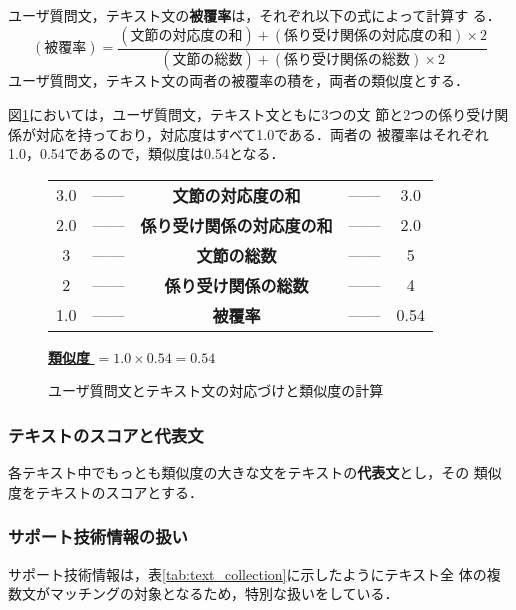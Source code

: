 ユーザ質問文，テキスト文の{\bf 被覆率}は，それぞれ以下の式によって計算す
る．
\[
 (被覆率) = \frac{(文節の対応度の和) + (係り受け関係の対応度の和) \times 2}
  {(文節の総数) + (係り受け関係の総数) \times 2}
\]
ユーザ質問文，テキスト文の両者の被覆率の積を，両者の類似度とする．

図\ref{fig:スコア計算}においては，ユーザ質問文，テキスト文ともに3つの文
節と2つの係り受け関係が対応を持っており，対応度はすべて1.0である．両者の
被覆率はそれぞれ1.0，0.54であるので，類似度は0.54となる．

\begin{figure}
 \begin{center}
  \vspace*{5mm}
  \begin{tabular}{ccccc}
   3.0 & ------ & {\bf 文節の対応度の和} & ------ & 3.0 \\
   2.0 & ------ & {\bf 係り受け関係の対応度の和} & ------ & 2.0 \\
   3 & ------ & {\bf 文節の総数} & ------ & 5 \\
   2 & ------ & {\bf 係り受け関係の総数} & ------ & 4 \\
   1.0 & ------ & {\bf 被覆率} & ------ & 0.54 \\
  \end{tabular}
  \vspace*{-4mm}

  \underline{{\bf 類似度} $ = 1.0 \times 0.54 = 0.54$ }
  \vspace*{4mm}
  \caption{ユーザ質問文とテキスト文の対応づけと類似度の計算} \label{fig:スコア計算}
  \end{center}
\end{figure}



\subsubsection{テキストのスコアと代表文} \label{subsubsec:テキストのスコアと代表文}

各テキスト中でもっとも類似度の大きな文をテキストの{\bf 代表文}とし，その
類似度をテキストのスコアとする．


\subsubsection{サポート技術情報の扱い}

サポート技術情報は，表\ref{tab:text_collection}に示したようにテキスト全
体の複数文がマッチングの対象となるため，特別な扱いをしている．

